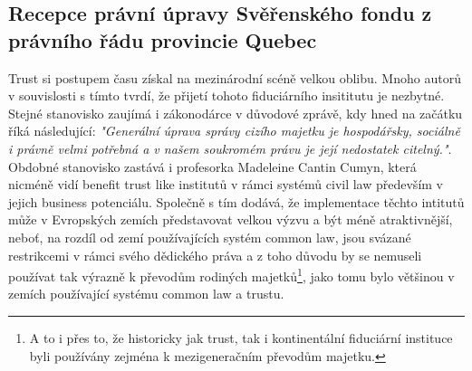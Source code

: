 \documentclass{article}
\begin{document}

\newpage

\subsection{Recepce právní úpravy Svěřenského fondu z právního řádu provincie Quebec}


Trust si postupem času získal na mezinárodní scéně velkou oblibu. Mnoho autorů v souvislosti s tímto tvrdí, že přijetí tohoto fiduciárního insititutu je nezbytné. Stejné stanovisko zaujímá i zákonodárce v důvodové zprávě, kdy hned na začátku říká následující: \textit{"Generální úprava správy cizího majetku je hospodářsky, sociálně i právně velmi potřebná a v našem soukromém právu je její nedostatek citelný."}.\\

Obdobné stanovisko zastává i profesorka Madeleine Cantin Cumyn, která nicméně vidí benefit trust like institutů v rámci systémů civil law především v jejich business potenciálu. Společně s tím dodává, že implementace těchto intitutů může v Evropských zemích představovat velkou výzvu a být méně atraktivnější, neboť, na rozdíl od zemí používajících systém common law, jsou svázané restrikcemi v rámci svého dědického práva a z toho důvodu by se nemuseli používat tak výrazně k převodům rodiných majetků\footnote{A to i přes to, že historicky jak trust, tak i kontinentální fiduciární instituce byli používány zejména k mezigeneračním převodům majetku.}, jako tomu bylo většinou v zemích používající systému common law a trustu.\\

\end{document}
